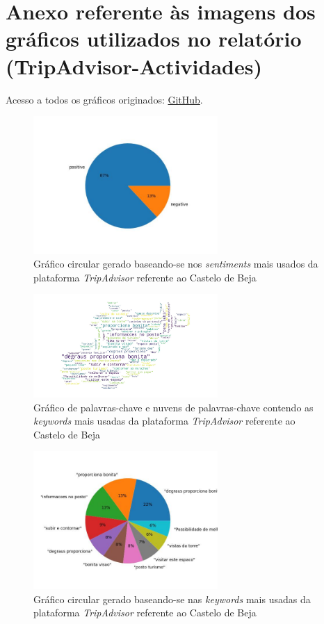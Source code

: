     \chapter{Anexo referente às imagens dos gráficos utilizados no relatório (TripAdvisor-Actividades)}
    \label{an3}

    Acesso a todos os gráficos originados: \href{https://github.com/CatKinKitKat/pi2021/tree/master/projecto/datascience/graphs/TripAdvisor/activities}{GitHub}.
    
    \begin{figure}[!htb]
    \centering
    \includegraphics[width=7cm]{figuras/TripAdvisor/Activities/place0_sentiments.jpeg}
    \caption{Gráfico circular gerado baseando-se nos \textit{sentiments} mais usados da plataforma \textit{TripAdvisor} referente ao Castelo de Beja}
    \label{fig:exemplofig}
    \end{figure}
    
    \begin{figure}[!htb]
    \centering
    \includegraphics[width=7cm]{figuras/TripAdvisor/Activities/place0_keywordcloud.jpeg}
    \caption{Gráfico de palavras-chave e nuvens de palavras-chave contendo as \textit{keywords} mais usadas da plataforma \textit{TripAdvisor} referente ao Castelo de Beja}
    \label{fig:exemplofig}
    \end{figure}
    
    \begin{figure}[!htb]
    \centering
    \includegraphics[width=7cm]{figuras/TripAdvisor/Activities/place0_keywords.jpeg}
    \caption{Gráfico circular gerado baseando-se nas \textit{keywords} mais usadas da plataforma \textit{TripAdvisor} referente ao Castelo de Beja}
    \label{fig:exemplofig}
    \end{figure}
    
